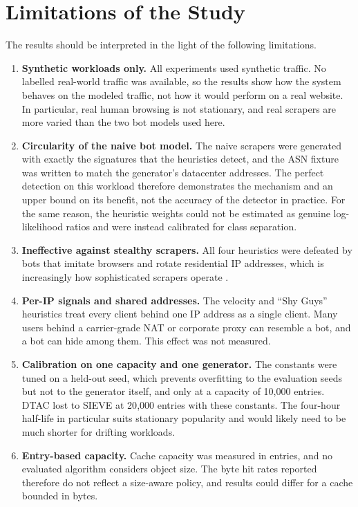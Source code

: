 \section{Limitations of the Study}
The results should be interpreted in the light of the following limitations.
\begin{enumerate}
    \item \textbf{Synthetic workloads only.} All experiments used synthetic traffic. No labelled real-world traffic was available, so the results show how the system behaves on the modeled traffic, not how it would perform on a real website. In particular, real human browsing is not stationary, and real scrapers are more varied than the two bot models used here.
    \item \textbf{Circularity of the naive bot model.} The naive scrapers were generated with exactly the signatures that the heuristics detect, and the ASN fixture was written to match the generator's datacenter addresses. The perfect detection on this workload therefore demonstrates the mechanism and an upper bound on its benefit, not the accuracy of the detector in practice. For the same reason, the heuristic weights could not be estimated as genuine log-likelihood ratios and were instead calibrated for class separation.
    \item \textbf{Ineffective against stealthy scrapers.} All four heuristics were defeated by bots that imitate browsers and rotate residential IP addresses, which is increasingly how sophisticated scrapers operate \cite{ousat_broken_2026}.
    \item \textbf{Per-IP signals and shared addresses.} The velocity and ``Shy Guys'' heuristics treat every client behind one IP address as a single client. Many users behind a carrier-grade NAT or corporate proxy can resemble a bot, and a bot can hide among them. This effect was not measured.
    \item \textbf{Calibration on one capacity and one generator.} The constants were tuned on a held-out seed, which prevents overfitting to the evaluation seeds but not to the generator itself, and only at a capacity of 10{,}000 entries. DTAC lost to SIEVE at 20{,}000 entries with these constants. The four-hour half-life in particular suits stationary popularity and would likely need to be much shorter for drifting workloads.
    \item \textbf{Entry-based capacity.} Cache capacity was measured in entries, and no evaluated algorithm considers object size. The byte hit rates reported therefore do not reflect a size-aware policy, and results could differ for a cache bounded in bytes.

\end{enumerate}

